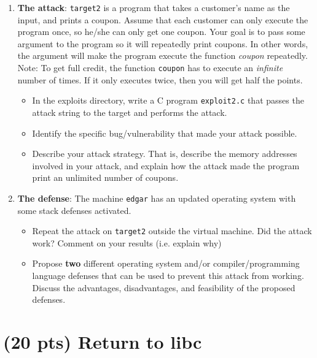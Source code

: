 \documentclass[11pt]{article}
\begin{document}
\begin{enumerate}
	\item \textbf{The attack}: \verb"target2" is a program that takes a customer's name as the input, and prints a coupon.  Assume that each customer can only execute the program once, so he/she can only get one coupon.  Your goal is to pass some argument to the program so it will repeatedly print coupons.  In other words, the argument will make the program execute the function {\em coupon} repeatedly.
	Note: To get full credit, the function \verb"coupon" has to execute an \emph{infinite} number of times. If it only executes twice, then you will get half the points.
	
	\begin{itemize}
		\item In the exploits directory, write a C program \verb"exploit2.c" that passes the attack string to the target and performs the attack.
		\item Identify the specific bug/vulnerability that made your attack possible.
		\item Describe your attack strategy. That is, describe the memory addresses involved in your attack, and explain how the attack made the program print an unlimited number of coupons.
	\end{itemize}
	
	\item \textbf{The defense}: The machine \verb"edgar" has an updated operating system with some stack defenses activated.
	\begin{itemize}
		\item Repeat the attack on \verb"target2" outside the virtual machine. Did the attack work? Comment on your results (i.e. explain why)
		\item Propose \textbf{two} different operating system and/or compiler/programming language defenses that can be used to prevent this attack from working. Discuss the advantages, disadvantages, and feasibility of the proposed defenses.
	\end{itemize}
	
\end{enumerate}

\section{(20 pts) Return to libc}
\end{document}
